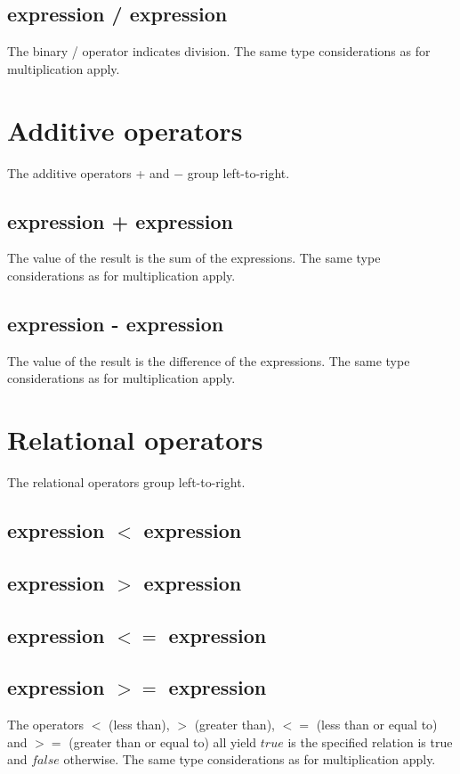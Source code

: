 \begin{homeworkProblem}
    \subsection{expression / expression}
    The binary / operator indicates division. The same type considerations as for multiplication apply.

    \section{Additive operators}
    The additive operators + and − group left-to-right.

    \subsection{expression + expression}
    The value of the result is the sum of the expressions. The same type considerations as for multiplication apply.

    \subsection{expression - expression}
    The value of the result is the difference of the expressions. The same type considerations as for multiplication apply.

    \section{Relational operators}
    The relational operators group left-to-right.
    
    \subsection{expression $<$ expression}
    \subsection{expression $>$ expression}
    \subsection{expression $<=$ expression}
    \subsection{expression $>=$ expression}
    The operators $<$ (less than), $>$ (greater than), $<=$ (less than or equal to) and $>=$ (greater than or equal to) all yield $true$ is the specified relation is true and $false$ otherwise. The same type considerations as for multiplication apply.


\end{homeworkProblem}
